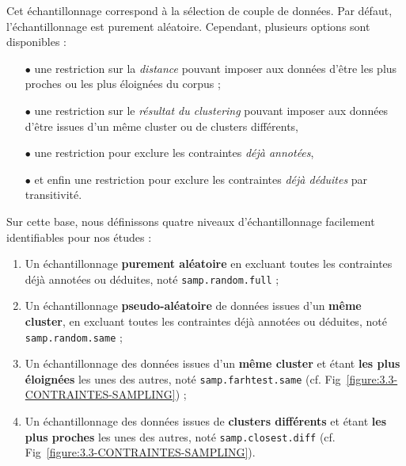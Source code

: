 		Cet échantillonnage correspond à la sélection de couple de données.
		Par défaut, l'échantillonnage est purement aléatoire.
		Cependant, plusieurs options sont disponibles :
		
		\begin{itemize}
			\item[\(\bullet\)] une restriction sur la \textit{distance} pouvant imposer aux données d'être les plus proches ou les plus éloignées du corpus ;
			\item[\(\bullet\)] une restriction sur le \textit{résultat du clustering} pouvant imposer aux données d'être issues d'un même cluster ou de clusters différents,
			\item[\(\bullet\)] une restriction pour exclure les contraintes \textit{déjà annotées},
			\item[\(\bullet\)] et enfin une restriction pour exclure les contraintes \textit{déjà déduites} par transitivité.
		\end{itemize}
		
		Sur cette base, nous définissons quatre niveaux d'échantillonnage facilement identifiables pour nos études :
		\begin{enumerate}
			\item Un échantillonnage \textbf{purement aléatoire} en excluant toutes les contraintes déjà annotées ou déduites, noté \texttt{samp.random.full} ;
			\item Un échantillonnage \textbf{pseudo-aléatoire} de données issues d'un \textbf{même cluster}, en excluant toutes les contraintes déjà annotées ou déduites, noté \texttt{samp.random.same} ;
			\item Un échantillonnage des données issues d'un \textbf{même cluster} et étant \textbf{les plus éloignées} les unes des autres, noté \texttt{samp.farhtest.same} (cf. Fig~\ref{figure:3.3-CONTRAINTES-SAMPLING}) ;
			\item Un échantillonnage des données issues de \textbf{clusters différents} et étant \textbf{les plus proches} les unes des autres, noté \texttt{samp.closest.diff} (cf. Fig~\ref{figure:3.3-CONTRAINTES-SAMPLING}).
		\end{enumerate}
		
